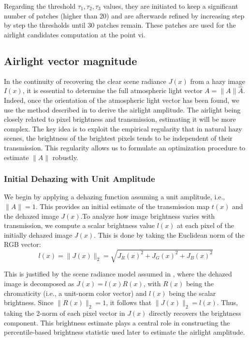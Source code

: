 \documentclass[conference]{IEEEtran}
\begin{document}
Regarding the threshold $\tau_1, \tau_2, \tau_3$ values, they are initiated to keep a significant number of patches (higher than 20) and are afterwards refined by increasing step
by step the thresholds until 30 patches remain.  These patches are used for the airlight candidates computation at the point vi.

\subsection{Airlight vector magnitude}
\label{NimaPart}
In the continuity of recovering the clear scene radiance \( J(x) \) from a hazy image \( I(x) \), it is essential to determine the full atmospheric light vector \( A = \|A\|\hat{A} \). 
Indeed, once the orientation of the atmospheric light vector has been found, we use the method described in \cite{airlight} to derive the airlight amplitude. The airlight being closely related to pixel brightness and transmission, estimating it will be more complex. The key idea is to exploit the empirical regularity that in natural hazy scenes, the brightness of the brightest pixels tends to be independent of their transmission. This regularity allows us to formulate an optimization procedure to estimate \( \|A\| \) robustly.

\subsubsection{Initial Dehazing with Unit Amplitude}

We begin by applying a dehazing function assuming a unit amplitude, i.e., \( \|A\| = 1 \). This provides an initial estimate of the transmission map \( t(x) \) and the dehazed image \( J(x) \).To analyze how image brightness varies with transmission, we compute a scalar brightness value \( l(x) \) at each pixel of the initially dehazed image \( J(x) \). This is done by taking the Euclidean norm of the RGB vector:
\begin{equation}
\label{initial_brightness }
l(x) = \|J(x)\|_2 = \sqrt{J_R(x)^2 + J_G(x)^2 + J_B(x)^2}
\end{equation}

This is justified by the scene radiance model assumed in \cite{airlight}, where the dehazed image is decomposed as \( J(x) = l(x) R(x) \), with \( R(x) \) being the chromaticity (i.e., a unit-norm color vector) and \( l(x) \) being the scalar brightness. Since \( \|R(x)\|_2 = 1 \), it follows that \( \|J(x)\|_2 = l(x) \). Thus, taking the 2-norm of each pixel vector in \( J(x) \) directly recovers the brightness component. This brightness estimate plays a central role in constructing the percentile-based brightness statistic used later to estimate the airlight amplitude.
\end{document}
